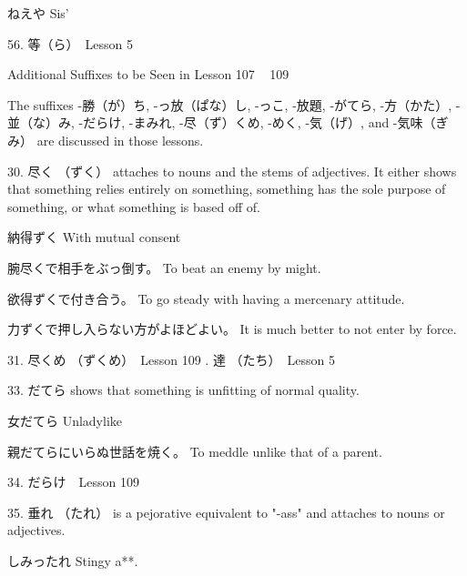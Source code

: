 \par{ねえや \hfill\break
Sis' }

\par{56. 等（ら）　\textrightarrow  Lesson 5  \hfill\break
}

\par{Additional Suffixes to be Seen in Lesson 107  ~  109  }

\par{The suffixes -勝（が）ち, -っ放（ぱな）し, -っこ, -放題, -がてら, -方（かた）, -並（な）み, -だらけ, -まみれ, -尽（ず）くめ, -めく, -気（げ）, and -気味（ぎみ） are discussed in those lessons. }

\par{30. 尽く （ずく） attaches to nouns and the stems of adjectives. It either shows that something relies entirely on something, something has the sole purpose of something, or what something is based off of. }

\par{納得ずく \hfill\break
With mutual consent }

\par{腕尽くで相手をぶっ倒す。 \hfill\break
To beat an enemy by might. }

\par{欲得ずくで付き合う。 \hfill\break
To go steady with having a mercenary attitude. }

\par{力ずくで押し入らない方がよほどよい。 \hfill\break
It is much better to not enter by force. }

\par{31. 尽くめ （ずくめ）　\textrightarrow  Lesson 109  \hfill{}. 達 （たち）　\textrightarrow  Lesson 5  }

\par{33. だてら shows that something is unfitting of normal quality. }

\par{女だてら \hfill\break
Unladylike }

\par{親だてらにいらぬ世話を焼く。 \hfill\break
To meddle unlike that of a parent. }

\par{34. だらけ　\textrightarrow  Lesson 109  }

\par{35. 垂れ （たれ） is a pejorative equivalent to "-ass" and attaches to nouns or adjectives. }

\par{しみったれ \hfill\break
Stingy a**. }

